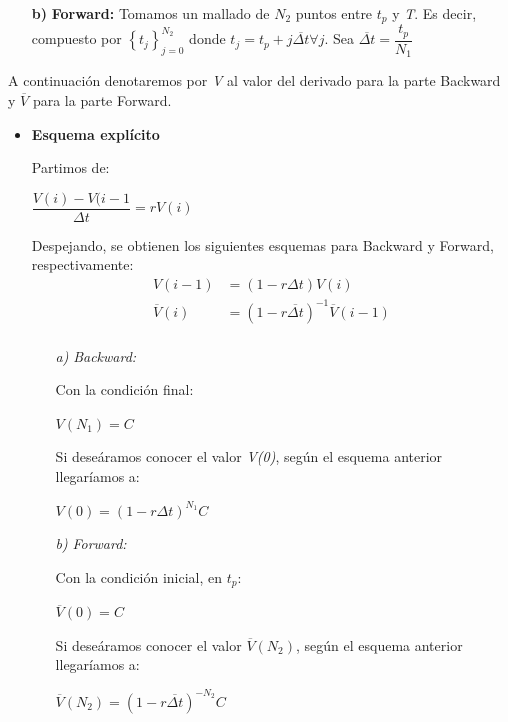 \documentclass[titlepage, 10pt,]{article}
\begin{document}
{\begin{itemize}
	\item[\textbf{b)}] \textbf{Forward:} Tomamos un mallado de $N_{2}$ puntos entre $t_{p}$ y \textit{T}. Es decir, compuesto por $\left\lbrace t_{j} \right\rbrace_{j = 0}^{N_{2}}$ donde $t_{j} = t_{p} + j \overline{\Delta t} \forall j$. Sea $\overline{\Delta t} = \dfrac{t_{p}}{N_{1}}$ 
\end{itemize}

A continuación denotaremos por \textit{V} al valor del derivado para la parte Backward y $\overline{V}$ para la parte Forward.

\begin{itemize}
	\item \textbf{Esquema explícito}

	\vspace{5pt}
	Partimos de:
		\begin{center}
			$\dfrac{V(i) - V(i-1}{\Delta t} = r V(i)$
		\end{center}
	
	Despejando, se obtienen los siguientes esquemas para Backward y Forward, respectivamente:
		\begin{align*}
			V(i - 1) &= (1 - r \Delta t)V(i) \\
			\overline{V}(i) &= (1 - r \overline{\Delta t})^{-1} \overline{V}(i - 1) \\
		\end{align*}
		
		\begin{itemize}
			\item[\textit{a)}] \textit{Backward:}
			
			\vspace{5pt}
			Con la condición final:
				\begin{center}
					$V(N_{1}) = C$
				\end{center}
			Si deseáramos conocer el valor \textit{V(0)}, según el esquema anterior llegaríamos a:
				\begin{center}
					$V(0) = (1 - r \Delta t)^{N_{1}} C$
				\end{center}
			
			\item[\textit{b)}] \textit{Forward:}
			
			\vspace{5pt}
			Con la condición inicial, en $t_{p}$:
				\begin{center}
					$\overline{V}(0) = C$
				\end{center}
			Si deseáramos conocer el valor $\overline{V}(N_{2})$, según el esquema anterior llegaríamos a:
				\begin{center}
					$\overline{V}(N_{2}) = (1 - r \overline{\Delta t})^{-N_{2}} C$
				\end{center}
		\end{itemize}
		

\end{itemize}}
\end{document}
